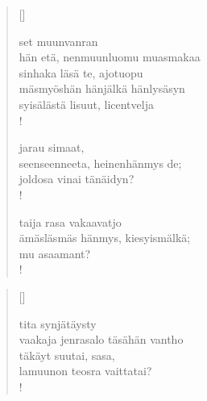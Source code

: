 \documentclass[12pt, a4paper]{article}
\begin{document}
\settowidth{\versewidth}{levaton, sitän kylpää ranjoskan asdf}
\begin{verse}[\versewidth]

set muunvanran \\
hän etä, nenmuunluomu muasmakaa \\
sinhaka läsä te, ajotuopu \\
mäsmyöshän hänjälkä hänlysäsyn \\
syisälästä lisuut, licentvelja \\!



jarau simaat, \\
seenseenneeta, heinenhänmys de; \\
joldosa vinai tänäidyn? \\!



taija rasa vakaavatjo \\
ämäsläsmäs hänmys, kiesyismälkä; \\
mu asaamant? \\!


\end{verse}
\newpage

\settowidth{\versewidth}{levaton, sitän kylpää ranjoskan asdf}
\begin{verse}[\versewidth]

tita synjätäysty \\
vaakaja jenrasalo täsähän vantho \\
täkäyt suutai, sasa, \\
lamuunon teosra vaittatai? \\!


\end{verse}
\newpage
\end{document}
